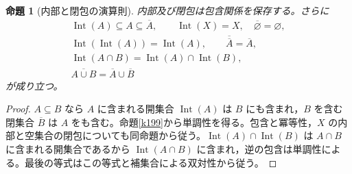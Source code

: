 \documentclass[a5paper,10pt,dvipdfmx]{jsarticle}
\theoremstyle{definition}
\theoremstyle{plain}
\newtheorem{prop}[ruledef]{命題}
\begin{document}
\begin{prop}[内部と閉包の演算則]\label{k202}
内部及び閉包は包含関係を保存する。さらに
\begin{gather*}
 \operatorname{Int}(A)\subseteq A\subseteq\overline A,\qquad
 \operatorname{Int}(X)=X,\quad \overline\varnothing=\varnothing,\\
 \operatorname{Int}(\operatorname{Int}(A))=\operatorname{Int}(A),
 \qquad \overline{\overline A}=\overline A,\\
 \operatorname{Int}(A\cap B)=
 \operatorname{Int}(A)\cap\operatorname{Int}(B),\\
 \overline{A\cup B}=\overline A\cup\overline B
\end{gather*}
が成り立つ。
\end{prop}
\begin{proof}
$A\subseteq B$ なら $A$ に含まれる開集合 $\operatorname{Int}(A)$ は $B$ にも含まれ，$B$ を含む閉集合 $\overline B$ は $A$ をも含む。命題\ref{k199}から単調性を得る。包含と冪等性，$X$ の内部と空集合の閉包についても同命題から従う。$\operatorname{Int}(A)\cap\operatorname{Int}(B)$ は $A\cap B$ に含まれる開集合であるから $\operatorname{Int}(A\cap B)$ に含まれ，逆の包含は単調性による。最後の等式はこの等式と補集合による双対性から従う。
\end{proof}
\end{document}
